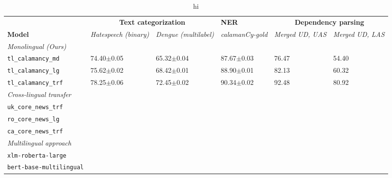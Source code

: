 \documentclass[../emnlp2023.tex]{subfiles}
\begin{document}
\begin{table*}[t]
\begin{tabular}{@{}p{4cm}p{2cm}p{2cm}p{2cm}p{2cm}p{2cm}@{}}
\toprule
                           & \multicolumn{2}{c}{\textbf{Text categorization}} & \textbf{NER} & \multicolumn{2}{c}{\textbf{Dependency parsing}}                         \\ 
\textbf{Model}             & \textit{Hatespeech (binary)} & \textit{Dengue (multilabel)} & \textit{calamanCy-gold} & \textit{Merged UD, UAS} & \textit{Merged UD, LAS} \\ \midrule 
\textit{Monolingual (Ours)}              \\
\texttt{tl\_calamancy\_md} & 74.40$\pm$0.05 & 65.32$\pm$0.04 & 87.67$\pm$0.03 & 76.47 & 54.40\\
\texttt{tl\_calamancy\_lg} & 75.62$\pm$0.02 & 68.42$\pm$0.01 & 88.90$\pm$0.01 & 82.13 & 60.32\\
\texttt{tl\_calamancy\_trf}& 78.25$\pm$0.06 & 72.45$\pm$0.02 & 90.34$\pm$0.02 & 92.48 & 80.92\\ \midrule
\textit{Cross-lingual transfer} \\
\texttt{uk\_core\_news\_trf} & \\
\texttt{ro\_core\_news\_lg} & \\
\texttt{ca\_core\_news\_trf} & \\ \midrule
\textit{Multilingual approach} \\
\texttt{xlm-roberta-large} \\
\texttt{bert-base-multilingual} \\
\bottomrule
\end{tabular}
\caption{
    hi
}
\label{table:results}
\end{table*}
\end{document}
